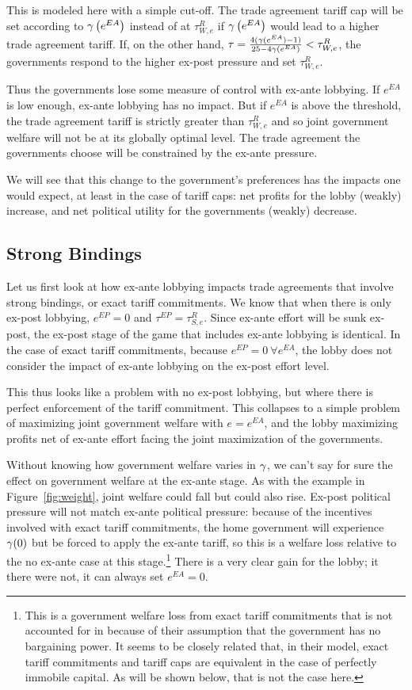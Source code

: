 This is modeled here with a simple cut-off. The trade agreement tariff cap will be set according to $\gamma\left(e^{EA}\right)$ instead of at $\tau^R_{W,e}$ if $\gamma\left(e^{EA}\right)$ would lead to a higher trade agreement tariff. If, on the other hand, $\tau = \frac{4(\gamma(e^{EA})-1)}{25-4\gamma(e^{EA})} < \tau^R_{W,e}$, the governments respond to the higher ex-post pressure and set $\tau^R_{W,e}$.

Thus the governments lose some measure of control with ex-ante lobbying. If $e^{EA}$ is low enough, ex-ante lobbying has no impact. But if $e^{EA}$ is above the threshold, the trade agreement tariff is strictly greater than $\tau^R_{W,e}$ and so joint government welfare will not be at its globally optimal level. The trade agreement the governments choose will be constrained by the ex-ante pressure.

We will see that this change to the government's preferences has the impacts one would expect, at least in the case of tariff caps: net profits for the lobby (weakly) increase, and net political utility for the governments (weakly) decrease.

\subsection{Strong Bindings}
Let us first look at how ex-ante lobbying impacts trade agreements that involve strong bindings, or exact tariff commitments. We know that when there is only ex-post lobbying, $e^{EP} =0$ and $\tau^{EP} = \tau^R_{S,e}$. Since ex-ante effort will be sunk ex-post, the ex-post stage of the game that includes ex-ante lobbying is identical. In the case of exact tariff commitments, because $e^{EP} = 0 \ \forall e^{EA}$, the lobby does not consider the impact of ex-ante lobbying on the ex-post effort level.

This thus looks like a problem with no ex-post lobbying, but where there is perfect enforcement of the tariff commitment. This collapses to a simple problem of maximizing joint government welfare with $e=e^{EA}$, and the lobby maximizing profits net of ex-ante effort facing the joint maximization of the governments.

Without knowing how government welfare varies in $\gamma$, we can't say for sure the effect on government welfare at the ex-ante stage. As with the example in Figure~\ref{fig:weight}, joint welfare could fall but could also rise. Ex-post political pressure will not match ex-ante political pressure: because of the incentives involved with exact tariff commitments, the home government will experience $\gamma(0)$ but be forced to apply the ex-ante tariff, so this is a welfare loss relative to the no ex-ante case at this stage.\footnote{This is a government welfare loss from exact tariff commitments that is not accounted for in \Textcite{mrc2007} because of their assumption that the government has no bargaining power. It seems to be closely related that, in their model,  exact tariff commitments and tariff caps are equivalent in the case of perfectly immobile capital. As will be shown below, that is not the case here.} There is a very clear gain for the lobby; it there were not, it can always set $e^{EA}=0$.
				
